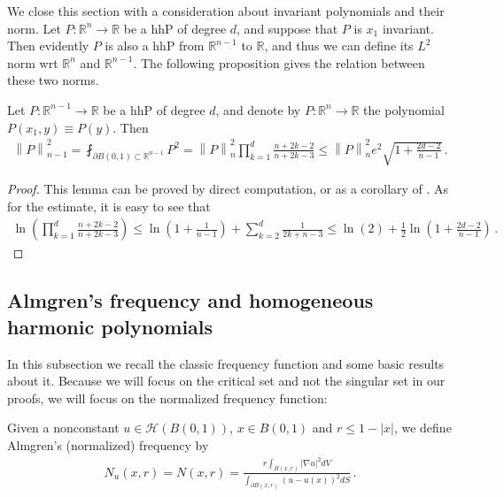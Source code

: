 \documentclass[11pt]{article}
\begin{document}
We close this section with a consideration about invariant polynomials and their norm. Let $P:{\mathbb{R}}^n\to {\mathbb{R}}$ be a hhP of degree $d$, and suppose that $P$ is $x_1$ invariant. Then evidently $P$ is also a hhP from ${\mathbb{R}}^{n-1}$ to ${\mathbb{R}}$, and thus we can define its $L^2$ norm wrt ${\mathbb{R}}^n$ and ${\mathbb{R}}^{n-1}$. The following proposition gives the relation between these two norms.
\begin{lemma}\label{lemma_norm_n}
 Let $P:{\mathbb{R}}^{n-1}\to {\mathbb{R}}$ be a hhP of degree $d$, and denote by $P:{\mathbb{R}}^{n}\to {\mathbb{R}}$ the polynomial $P(x_1,y)\equiv P(y)$. Then
 \begin{gather}
  {\left\|{P}\right\|}^2_{n-1} = \fint_{\partial B(0,1)\subset {\mathbb{R}}^{n-1}} P^2 = {\left\|{P}\right\|}^2_{n}\prod_{k=1}^d \frac{n+2k-2}{n+2k-3}\leq {\left\|{P}\right\|}^2_{n}e^2\sqrt{1+\frac{2d-2}{n-1}} \, .
 \end{gather}
\end{lemma}
\begin{proof}
 This lemma can be proved by direct computation, or as a corollary of \cite[Theorem 5.14]{HFT}.  As for the estimate, it is easy to see that
 \begin{gather}
  \ln{\left({\prod_{k=1}^d \frac{n+2k-2}{n+2k-3}}\right)} \leq \ln{\left({1+\frac 1 {n-1}}\right)} + \sum_{k=2}^d \frac 1 {2k+n-3} \leq \ln{\left({2}\right)} + \frac 1 2 \ln{\left({1+\frac{2d-2}{n-1}}\right)}\, .
 \end{gather}

\end{proof}

\subsection{Almgren's frequency and homogeneous harmonic polynomials}\label{ss:frequency_hhp}

In this subsection we recall the classic frequency function and some basic results about it.  Because we will focus on the critical set and not the singular set in our proofs, we will focus on the normalized frequency function:

\begin{definition}
 Given a nonconstant $u\in {\mathcal{H}}(B(0,1))$, $x\in B(0,1)$ and $r\leq 1-{\left|x\right|}$, we define Almgren's (normalized) frequency by
 \begin{gather}
  N_u(x,r)=N(x,r) = \frac{r \int_{B(x,r)} {\left|{\nabla u}\right|}^2 dV }{\int_{\partial B(x,r)} (u-u(x))^2 dS }\, .
 \end{gather}
\end{definition}
\end{document}
